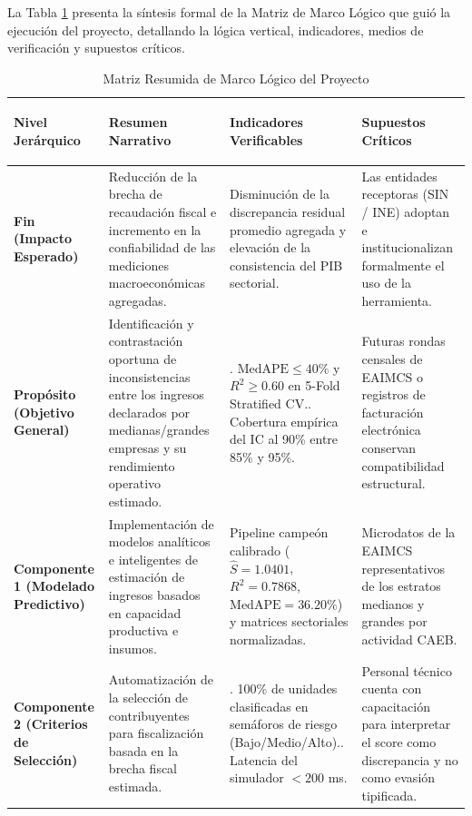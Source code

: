 La Tabla \ref{tab:mml_resumen} presenta la síntesis formal de la Matriz de Marco Lógico que guió la ejecución del proyecto, detallando la lógica vertical, indicadores, medios de verificación y supuestos críticos.

\begin{table}[htbp]
\centering
\caption{Matriz Resumida de Marco Lógico del Proyecto}
\label{tab:mml_resumen}
\scriptsize
\setlength{\tabcolsep}{4pt}
\begin{tabularx}{\textwidth}{>{\bfseries\raggedright\arraybackslash}p{2.3cm} >{\raggedright\arraybackslash}X >{\raggedright\arraybackslash}p{3.5cm} >{\raggedright\arraybackslash}p{3.4cm}}
\toprule
\textbf{Nivel Jerárquico} & \textbf{Resumen Narrativo} & \textbf{Indicadores Verificables} & \textbf{Supuestos Críticos} \\
\midrule
\textbf{Fin (Impacto Esperado)} & Reducción de la brecha de recaudación fiscal e incremento en la confiabilidad de las mediciones macroeconómicas agregadas. & Disminución de la discrepancia residual promedio agregada y elevación de la consistencia del PIB sectorial. & Las entidades receptoras (SIN / INE) adoptan e institucionalizan formalmente el uso de la herramienta. \\
\addlinespace
\textbf{Propósito (Objetivo General)} & Identificación y contrastación oportuna de inconsistencias entre los ingresos declarados por medianas/grandes empresas y su rendimiento operativo estimado. & 1. $\text{MedAPE} \le 40\%$ y $R^2 \ge 0.60$ en 5-Fold Stratified CV.\newline 2. Cobertura empírica del IC al 90\% entre 85\% y 95\%. & Futuras rondas censales de EAIMCS o registros de facturación electrónica conservan compatibilidad estructural. \\
\addlinespace
\textbf{Componente 1 (Modelado Predictivo)} & Implementación de modelos analíticos e inteligentes de estimación de ingresos basados en capacidad productiva e insumos. & Pipeline campeón calibrado ($\hat{S} = 1.0401$, $R^2 = 0.7868$, $\text{MedAPE} = 36.20\%$) y matrices sectoriales normalizadas. & Microdatos de la EAIMCS representativos de los estratos medianos y grandes por actividad CAEB. \\
\addlinespace
\textbf{Componente 2 (Criterios de Selección)} & Automatización de la selección de contribuyentes para fiscalización basada en la brecha fiscal estimada. & 1. 100\% de unidades clasificadas en semáforos de riesgo (Bajo/Medio/Alto).\newline 2. Latencia del simulador $< 200$ ms. & Personal técnico cuenta con capacitación para interpretar el score como discrepancia y no como evasión tipificada. \\

\end{tabularx}
\end{table}
